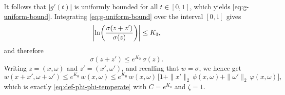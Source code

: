 \documentclass[a4paper,12pt]{article}
\let\originalleft\left
\let\originalright\right
\renewcommand{\left}{\mathopen{}\mathclose\bgroup\originalleft}
\renewcommand{\right}{\aftergroup\egroup\originalright}
\begin{document}
It follows that $|g'(t)|$ is uniformly bounded for all $t\in[0,1]$, 
which yields \eqref{eq:g-uniform-bound}.
Integrating \eqref{eq:g-uniform-bound}
over the interval $[0,1]$ 
gives
\begin{equation}\label{eq:proof-weight-temperate-DR4}
    \left|\ln \left(\frac{\sigma(z+z')}{\sigma(z)}\right)\right|
    \le
    K_0,
\end{equation}
and therefore
\[
    \sigma(z+z') \le e^{K_0}\,\sigma(z).
\]
Writing \(z=(x,\omega)\) and \(z'=(x',\omega')\), and recalling that \(w=\sigma\), we hence get 
\[
w(x+x',\omega+\omega')
\le
e^{K_0}\,w(x,\omega)
\le
e^{K_0}\,w(x,\omega)\,
\bigl[1+\|x'\|_2\,\phi(x,\omega)+\|\omega'\|_2\,\varphi(x,\omega)\bigr],
\]
which is exactly \eqref{eq:def-phi-phi-temperate} with \(C=e^{K_0}\) and \(\zeta=1\).
\end{document}
